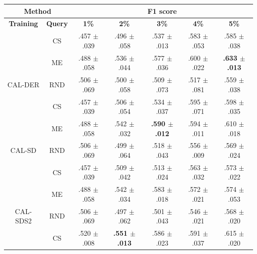 \begin{table}[htbp]
\centering

\begin{tabular*}{\linewidth}{c|c|@{\extracolsep{\fill}}ccccc}
\toprule
\multicolumn{2}{c|}{\textbf{Method}} & \multicolumn{5}{c}{\textbf{F1 score}} \\
\midrule
\textbf{Training} & \textbf{Query} & \textbf{1\%} & \textbf{2\%} & \textbf{3\%} & \textbf{4\%} & \textbf{5\%}\\
\midrule
 & CS & .457 $\pm$ {\small .039} & .496 $\pm$ {\small .058} & .537 $\pm$ {\small .013} & .583 $\pm$ {\small .053} & .585 $\pm$ {\small .038}\\

 & ME & .488 $\pm$ {\small .058} & .536 $\pm$ {\small .044} & .577 $\pm$ {\small .036} & .600 $\pm$ {\small .022} & \textbf{.633 $\pm$ {\small .013}}\\

\multirow{-3}{*}{\raggedright\arraybackslash CAL-DER} & RND & .506 $\pm$ {\small .069} & .500 $\pm$ {\small .058} & .509 $\pm$ {\small .073} & .517 $\pm$ {\small .081} & .559 $\pm$ {\small .038}\\
\midrule
 & CS & .457 $\pm$ {\small .039} & .506 $\pm$ {\small .054} & .534 $\pm$ {\small .037} & .595 $\pm$ {\small .071} & .598 $\pm$ {\small .035}\\

 & ME & .488 $\pm$ {\small .058} & .542 $\pm$ {\small .032} & \textbf{.590 $\pm$ {\small .012}} & .594 $\pm$ {\small .011} & .610 $\pm$ {\small .018}\\

\multirow{-3}{*}{\raggedright\arraybackslash CAL-SD} & RND & .506 $\pm$ {\small .069} & .499 $\pm$ {\small .064} & .518 $\pm$ {\small .043} & .556 $\pm$ {\small .009} & .569 $\pm$ {\small .024}\\
\midrule
 & CS & .457 $\pm$ {\small .039} & .509 $\pm$ {\small .042} & .513 $\pm$ {\small .024} & .563 $\pm$ {\small .032} & .573 $\pm$ {\small .022}\\

 & ME & .488 $\pm$ {\small .058} & .542 $\pm$ {\small .034} & .583 $\pm$ {\small .018} & .572 $\pm$ {\small .021} & .574 $\pm$ {\small .053}\\

\multirow{-3}{*}{\raggedright\arraybackslash CAL-SDS2} & RND & .506 $\pm$ {\small .069} & .497 $\pm$ {\small .062} & .501 $\pm$ {\small .043} & .546 $\pm$ {\small .021} & .568 $\pm$ {\small .020}\\
\midrule
 & CS & .520 $\pm$ {\small .008} & \textbf{.551 $\pm$ {\small .013}} & .586 $\pm$ {\small .023} & .591 $\pm$ {\small .037} & .615 $\pm$ {\small .020}\\


\end{tabular*}
\end{table}
